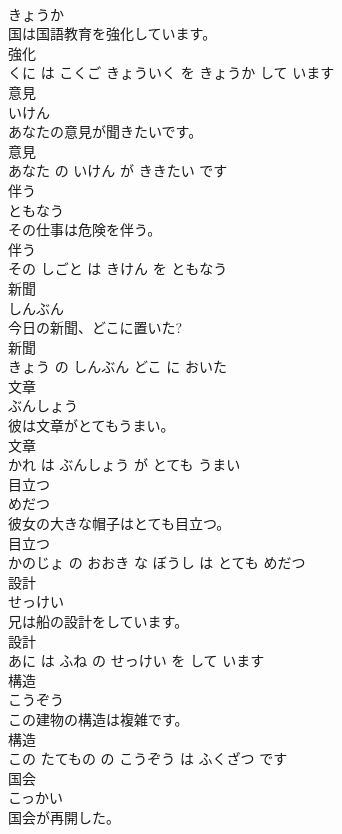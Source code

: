 \documentclass[8pt]{extreport}
\begin{document}
\begin{CJK}{UTF8}{min}
\\	きょうか			
\\	国は国語教育を強化しています。	
\\	強化 
\\	くに は こくご きょういく を きょうか して います			
\\	意見	
\\	いけん			
\\	あなたの意見が聞きたいです。	
\\	意見 
\\	あなた の いけん が ききたい です			
\\	伴う	
\\	ともなう			
\\	その仕事は危険を伴う。	
\\	伴う 
\\	その しごと は きけん を ともなう			
\\	新聞	
\\	しんぶん			
\\	今日の新聞、どこに置いた?	
\\	新聞 
\\	きょう の しんぶん どこ に おいた			
\\	文章	
\\	ぶんしょう			
\\	彼は文章がとてもうまい。	
\\	文章 
\\	かれ は ぶんしょう が とても うまい			
\\	目立つ	
\\	めだつ			
\\	彼女の大きな帽子はとても目立つ。	
\\	目立つ 
\\	かのじょ の おおき な ぼうし は とても めだつ			
\\	設計	
\\	せっけい			
\\	兄は船の設計をしています。	
\\	設計 
\\	あに は ふね の せっけい を して います			
\\	構造	
\\	こうぞう			
\\	この建物の構造は複雑です。	
\\	構造 
\\	この たてもの の こうぞう は ふくざつ です			
\\	国会	
\\	こっかい			
\\	国会が再開した。	

\end{CJK}
\end{document}
